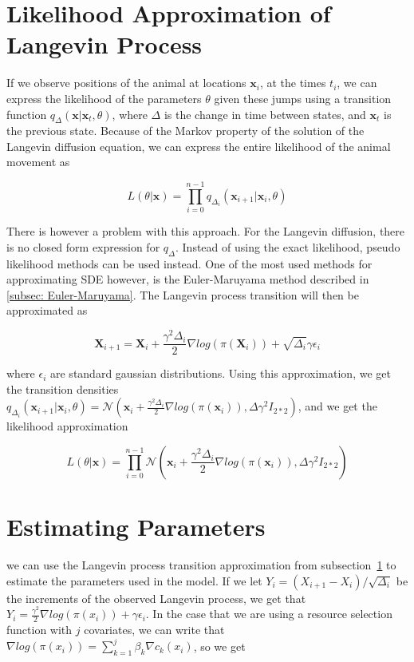 \section{Likelihood Approximation of Langevin Process}
\label{sec: Likelihood Approximation of Langevin Process}
If we observe positions of the animal at locations $\textbf{x}_i$, at the times $t_i$, we can express the likelihood of the parameters $\theta$ given these jumps using a transition function $q_\Delta(\textbf{x} | \textbf{x}_t, \theta)$, where $\Delta$ is the change in time between states, and $\textbf{x}_t$ is the previous state. Because of the Markov property of the solution of the Langevin diffusion equation, we can express the entire likelihood of the animal movement as

\begin{equation}
    L(\theta | \textbf{x}) = \prod_{i=0}^{n-1} q_{\Delta_i}(\textbf{x}_{i+1} | \textbf{x}_i, \theta)
    \label{eq: Langevin likelihood}
\end{equation}

There is however a problem with this approach. For the Langevin diffusion, there is no closed form expression for $q_\Delta$\cite{gloaguen_stochastic_2018}. Instead of using the exact likelihood, pseudo likelihood methods can be used instead. One of the most used methods for approximating SDE however, is the Euler-Maruyama method described in \ref{subsec: Euler-Maruyama}. The Langevin process transition will then be approximated as

$$
    \textbf{X}_{i+1} = \textbf{X}_i + \frac{\gamma^2 \Delta_i}{2}\nabla log(\pi(\textbf{X}_i)) + \sqrt{\Delta_i}\gamma \epsilon_i
$$

where $\epsilon_i$ are standard gaussian distributions. Using this approximation, we get the transition densities $q_{\Delta_i}(\textbf{x}_{i+1} | \textbf{x}_i, \theta) = \mathcal{N}(\textbf{x}_i + \frac{\gamma^2 \Delta_i}{2}\nabla log(\pi(\textbf{x}_i)), \Delta \gamma^2 I_{2*2})$, and we get the likelihood approximation

$$L(\theta | \textbf{x}) = \prod_{i=0}^{n-1} \mathcal{N}(\textbf{x}_i + \frac{\gamma^2 \Delta_i}{2}\nabla log(\pi(\textbf{x}_i)), \Delta \gamma^2 I_{2*2})$$







\section{Estimating Parameters}
\label{sec: estimating parameters}
we can use the Langevin process transition approximation from subsection~\ref{sec: Likelihood Approximation of Langevin Process} to estimate the parameters used in the model. If we let $Y_i = (X_{i+1} - X_i)/\sqrt{\Delta_i}$ be the increments of the observed Langevin process, we get that $Y_i = \frac{\gamma^2}{2}\nabla log(\pi(x_i)) + \gamma \epsilon_i$. In the case that we are using a resource selection function with $j$ covariates, we can write that $\nabla log(\pi(x_i)) = \sum_{k = 1}^j \beta_k \nabla c_k(x_i)$, so we get

